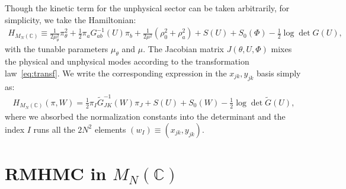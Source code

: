 \documentclass[12pt]{article}
\begin{document}
Though the kinetic term for the unphysical sector
can be taken arbitrarily,
for simplicity, we take the Hamiltonian:
\begin{align}
  H_{M_N(\mathbb{C})}
  \equiv
  \frac{1}{2 \mu_\theta^2}
  \pi_\theta^2
  +
  \frac{1}{2}
  \pi_a G^{-1}_{ab} (U) \pi_b
  +
  \frac{1}{2 \mu^2}
  (
  \rho_0^2
  +
  \rho_a^2
  )
  +
  S(U)
  +
  S_0(\Phi)
  - \frac{1}{2} \log \det G(U),
\end{align}
with the tunable parameters $\mu_\theta$ and $\mu$.
The Jacobian matrix $J(\theta, U, \Phi)$ mixes the
physical and unphysical modes according to
the transformation law~\eqref{eq:transf}.
We write the corresponding expression in the $x_{jk}, y_{jk}$
basis simply as:
\begin{align}
  H_{M_N(\mathbb{C})}
  (\pi, W)
  =
  \frac{1}{2} \pi_I \tilde{G}_{JK}^{-1}(W) \pi_J + S(U) + S_0(W)
  - \frac{1}{2} \log \det \tilde G(U),
  \label{eq:Hamil_GLN}
\end{align}
where we absorbed the normalization constants into the determinant
and the index $I$ runs all the $2N^2$ elements
$(w_I) \equiv ( x_{jk}, y_{jk} )$.


\section{RMHMC in $M_N(\mathbb{C})$}
\label{sec:rmhmc_gln}
\end{document}

